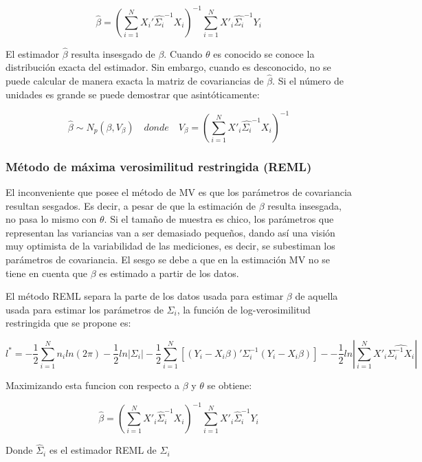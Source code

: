 \documentclass[spanish]{article}
\numberwithin{figure}{subsection}
\numberwithin{equation}{subsection}
\numberwithin{table}{subsection}
\begin{document}
\[ \hat{\beta} = (\sum_{i=1}^{N} X_i'\hat{\varSigma_i}^{-1}X_i)^{-1}
\sum_{i=1}^{N} X'_i\hat{\varSigma_i}^{-1}Y_i \]

El estimador $\hat{\beta}$ resulta insesgado de $\beta$. Cuando $\theta$ es
conocido se conoce la distribución exacta del estimador. Sin embargo, cuando es
desconocido, no se puede calcular de manera exacta la matriz de covariancias de
$\hat{\beta}$. Si el número de unidades es grande se puede demostrar que
asintóticamente:

\[ \hat{\beta} \sim N_p(\beta, V_{\beta}) \quad donde \quad V_{\beta} =
(\sum_{i=1}^{N} X'_i\hat{\varSigma_i}^{-1}X_i)^{-1} \]


\subsubsection{Método de máxima verosimilitud restringida (REML)}

El inconveniente que posee el método de MV es que los parámetros de covariancia
resultan sesgados. Es decir, a pesar de que la estimación de $\beta$ resulta
insesgada, no pasa lo mismo con $\theta$. Si el tamaño de muestra es chico, los
parámetros que representan las variancias van a ser demasiado pequeños, dando
así una visión muy optimista de la variabilidad de las mediciones, es decir, se
subestiman los parámetros de covariancia. El sesgo se debe a que en la
estimación MV no se tiene en cuenta que $\beta$ es estimado a partir de los
datos.

El método REML separa la parte de los datos usada para estimar $\beta$ de
aquella usada para estimar los parámetros de $\varSigma_i$, la función de
log-verosimilitud restringida que se propone es:

\begin{equation}
\label{REML}
	l^* = -\frac{1}{2} \sum_{i=1}^{N}n_i ln(2\pi) - \frac{1}{2}ln|\varSigma_i| -
	\frac{1}{2} \sum_{i=1}^{N} [(Y_i - X_i\beta)'
	\varSigma_i^{-1} (Y_i - X_i\beta)] -
	- \frac{1}{2} ln |\sum_{i=1}^{N} X'_i \hat{\varSigma_i^{-1} X_i}|
\end{equation}

Maximizando esta funcion con respecto a $\beta$ y $\theta$ se obtiene:

\[ \hat{\beta} = (\sum_{i=1}^{N} X'_i \hat{\varSigma}_i^{-1} X_i)^{-1}
\sum_{i=1}^{N} X'_i \hat{\varSigma}_i^{-1} Y_i\]

Donde $\hat{\varSigma}_i$ es el estimador REML de ${\varSigma_i}$
\end{document}
